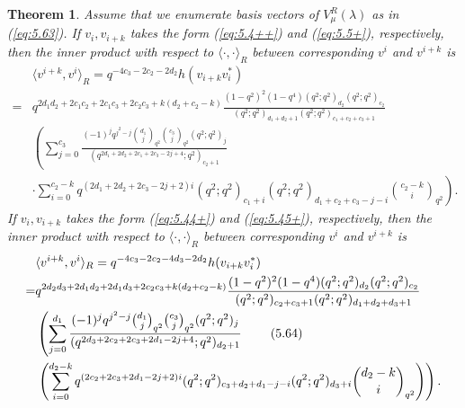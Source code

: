 \documentclass[table,a4paper,reqno]{amsart}
\numberwithin{equation}{section}
\newtheorem{theorem}{Theorem}[section]
\theoremstyle{definition}
\begin{document}
\begin{theorem}
    Assume that we enumerate basis vectors of $V^R_\mu(\lambda)$ as in (\ref{eq:5.63}). If $v_i,v_{i+k}$ takes the form (\ref{eq:5.4++}) and (\ref{eq:5.5+}), respectively, then the inner product with respect to $\langle\cdot,\cdot\rangle_R$ between corresponding $v^i$ and $v^{i+k}$ is
    \begin{equation}
        \begin{split}
            &\langle v^{i+k},v^i\rangle_R=q^{-4c_3-2c_2-2d_2}h(v_{i+k}v^*_i)\\
            =&q^{2d_1d_2+2c_1c_2+2c_1c_3+2c_2c_3+k(d_2+c_2-k)}\frac{(1-q^2)^2(1-q^4)(q^2;q^2)_{d_2}(q^2;q^2)_{c_2}}{(q^2;q^2)_{d_1+d_2+1}(q^2;q^2)_{c_1+c_2+c_3+1}}\\
            &\left(\sum_{j=0}^{c_3}\frac{(-1)^{j}q^{j^2-j}{d_1\choose j}_{q^{2}}{c_3\choose j}_{q^2}(q^2;q^2)_{j}}{(q^{2d_1+2d_2+2c_1+2c_3-2j+4};q^2)_{c_2+1}}\right.\\
            &\left.\cdot\sum_{i=0}^{c_2-k}q^{(2d_1+2d_2+2c_3-2j+2)i}(q^2;q^2)_{c_1+i}(q^2;q^2)_{d_1+c_2+c_3-j-i}{c_2-k\choose i}_{q^2}\right).
        \end{split}
    \end{equation}
    If $v_i,v_{i+k}$ takes the form (\ref{eq:5.44+}) and (\ref{eq:5.45+}), respectively, then the inner product with respect to $\langle\cdot,\cdot\rangle_R$ between corresponding $v^i$ and $v^{i+k}$ is
    \begin{align}\stepcounter{equation}
            &\langle v^{i+k},v^i\rangle_R=q^{-4c_3-2c_2-4d_3-2d_2}h(v_{i+k}v^*_i)\notag\\
            =&q^{2d_2d_3+2d_1d_2+2d_1d_3+2c_2c_3+k(d_2+c_2-k)}\frac{(1-q^2)^2(1-q^4)(q^2;q^2)_{d_2}(q^2;q^2)_{c_2}}{(q^2;q^2)_{c_2+c_3+1}(q^2;q^2)_{d_1+d_2+d_3+1}}\notag\\
            &\left(\sum_{j=0}^{d_1}\frac{(-1)^jq^{j^2-j}{d_1\choose j}_{q^2}{c_3\choose j}_{q^2}(q^2;q^2)_j}{(q^{2d_3+2c_2+2c_3+2d_1-2j+4};q^2)_{d_2+1}}\right.\tag{5.64}\\
            &\left.\left(\sum_{i=0}^{d_2-k}q^{(2c_2+2c_3+2d_1-2j+2)i}(q^2;q^2)_{c_3+d_2+d_1-j-i}(q^2;q^2)_{d_3+i}{d_2-k\choose i}_{q^2}\right)\right).\notag
    \end{align}
\end{theorem}
\end{document}
